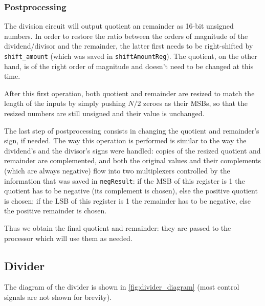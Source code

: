 \subsubsection{Postprocessing}
The division circuit will output quotient an remainder as 16-bit unsigned numbers.
In order to restore the ratio between the orders of magnitude of the dividend/divisor and the remainder, the latter first needs to be right-shifted by \texttt{shift\_amount} (which was saved in \texttt{shiftAmountReg}).
The quotient, on the other hand, is of the right order of magnitude and doesn't need to be changed at this time.

After this first operation, both quotient and remainder are resized to match the length of the inputs by simply pushing $N/2$ zeroes as their MSBs, so that the resized numbers are still unsigned and their value is unchanged.

The last step of postprocessing consists in changing the quotient and remainder's sign, if needed. 
The way this operation is performed is similar to the way the dividend's and the divisor's signs were handled: copies of the resized quotient and remainder are complemented, and both the original values and their complements (which are always negative) flow into two multiplexers controlled by the information that was saved in \texttt{negResult}: if the MSB of this register is 1 the quotient has to be negative (its complement is chosen), else the positive quotient is chosen; if the LSB of this register is 1 the remainder has to be negative, else the positive remainder is chosen.

Thus we obtain the final quotient and remainder: they are passed to the processor which will use them as needed.

\subsection{Divider}
The diagram of the divider is shown in \autoref{fig:divider_diagram} (most control signals are not shown for brevity).

